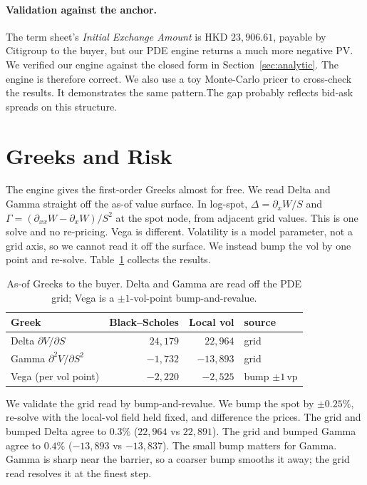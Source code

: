 \documentclass[11pt]{article}
\begin{document}
\paragraph{Validation against the anchor.} The term sheet's \emph{Initial Exchange Amount} is HKD
$23{,}906.61$, payable by Citigroup to the buyer, but our PDE engine returns a much more negative PV. We verified our engine against the closed form in Section~\ref{sec:analytic}. The engine is therefore correct. We also use a toy Monte-Carlo pricer to cross-check the results. It demonstrates the same pattern.The gap probably reflects bid-ask spreads on this structure.

\section{Greeks and Risk}\label{sec:greeks}
The engine gives the first-order Greeks almost for free. We read Delta and Gamma straight off the
as-of value surface. In log-spot, $\Delta=\partial_x W/S$ and $\Gamma=(\partial_{xx}W-\partial_x W)/S^2$
at the spot node, from adjacent grid values. This is one solve and no re-pricing. Vega is different.
Volatility is a model parameter, not a grid axis, so we cannot read it off the surface. We instead
bump the vol by one point and re-solve. Table~\ref{tab:greeks} collects the results.

\begin{table}[h]\centering\small
\begin{tabular}{@{}lrrl@{}}
\toprule
Greek & Black--Scholes & Local vol & source \\
\midrule
Delta $\partial V/\partial S$      & $24{,}179$ & $22{,}964$ & grid \\
Gamma $\partial^2 V/\partial S^2$  & $-1{,}732$ & $-13{,}893$ & grid \\
Vega (per vol point)               & $-2{,}220$ & $-2{,}525$ & bump $\pm1$\,vp \\
\bottomrule
\end{tabular}
\caption{As-of Greeks to the buyer. Delta and Gamma are read off the PDE grid; Vega is a
$\pm1$-vol-point bump-and-revalue.}
\label{tab:greeks}
\end{table}

We validate the grid read by bump-and-revalue. We bump the spot by $\pm0.25\%$, re-solve with the
local-vol field held fixed, and difference the prices. The grid and bumped Delta agree to $0.3\%$
($22{,}964$ vs $22{,}891$). The grid and bumped Gamma agree to $0.4\%$ ($-13{,}893$ vs $-13{,}837$).
The small bump matters for Gamma. Gamma is sharp near the barrier, so a coarser bump smooths it away;
the grid read resolves it at the finest step.
\end{document}
